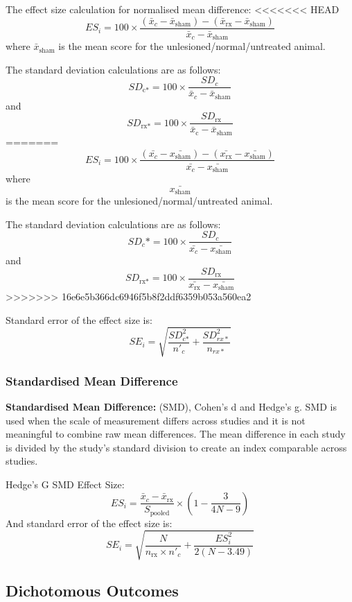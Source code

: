 \documentclass[
]{book}
\begin{document}
The effect size calculation for normalised mean difference:
\textless\textless\textless\textless\textless\textless\textless{} HEAD
\[ES_i= 100 \times  \frac {(\bar{x}_c - \bar{x}_\text{sham}) - (\bar{x}_\text{rx} - \bar{x}_\text{sham})}{\bar{x}_c - \bar{x}_\text{sham}}\] where \(\bar{x}_\text{sham}\) is the mean score for the unlesioned/normal/untreated animal.

The standard deviation calculations are as follows:
\[SD_\text{c*} = 100 \times \frac {SD_c}{\bar{x}_c - \bar{x}_\text{sham}}\] and \[SD_\text{rx*} = 100 \times \frac {SD_\text{rx}}{\bar{x}_\text{c} - \bar{x}_\text{sham}}\]
=======
\[ES_i= 100 \times  \frac {(\bar{x_c} - \bar{x_\text{sham}}) - (\bar{x_\text{rx}} - \bar{x_\text{sham}})}{\bar{x_c} - \bar{x_\text{sham}}} \] where \[\bar{x_\text{sham}} \] is the mean score for the unlesioned/normal/untreated animal.

The standard deviation calculations are as follows:
\[SD_c* = 100 \times \frac {SD_c}{\bar{x_c} - \bar{x_\text{sham}}}\] and \[SD_\text{rx*} = 100 \times \frac {SD_\text{rx}}{\bar{x_\text{rx}} - \bar{x_\text{sham}}}\]
\textgreater\textgreater\textgreater\textgreater\textgreater\textgreater\textgreater{} 16e6e5b366dc6946f5b8f2ddf6359b053a560ea2

Standard error of the effect size is:
\[SE_i = \sqrt{ \frac{SD_\text{c*}^2}{n'_c} + \frac {SD_{rx*}^2}{n_{rx*}} }\]

\hypertarget{standardised-mean-difference}{%
\subsubsection{Standardised Mean Difference}\label{standardised-mean-difference}}

\textbf{Standardised Mean Difference:} (SMD), Cohen's d and Hedge's g. SMD is used when the scale of measurement differs across studies and it is not meaningful to combine raw mean differences. The mean difference in each study is divided by the study's standard division to create an index comparable across studies.

Hedge's G SMD Effect Size:
\[ES_i = \frac {\bar{x}_c - \bar{x}_\text{rx}}{S_{\text{pooled}}} \times (1 - \frac{3}{4N - 9})  \]
And standard error of the effect size is:
\[ SE_i = \sqrt{ \frac{N}{n_{\text{rx}} \times n'_c} + \frac{ES_i^2}{2(N - 3.49)} }\]

\hypertarget{dichotomous-outcomes}{%
\subsection{Dichotomous Outcomes}\label{dichotomous-outcomes}}
\end{document}
